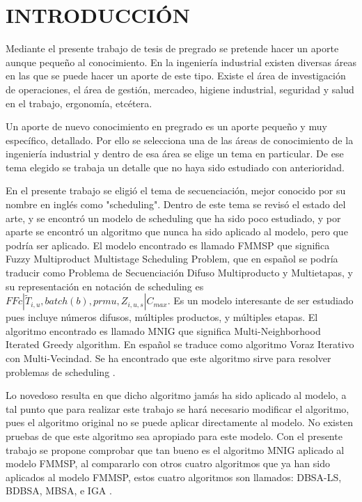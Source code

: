 \documentclass{article}
\def\notac_modelo{$FFc | \tilde{T}_{i, u}, batch(b), prmu, Z_{i, u, s} | C_{max}$}
\begin{document}
\section{INTRODUCCIÓN}

Mediante el presente trabajo de tesis de pregrado se pretende hacer un aporte aunque pequeño al conocimiento. En la ingeniería industrial existen diversas áreas en las que se puede hacer un aporte de este tipo. Existe el área de investigación de operaciones, el área de gestión, mercadeo, higiene industrial, seguridad y salud en el trabajo, ergonomía, etcétera. 

\vspace{\baselineskip}
Un aporte de nuevo conocimiento en pregrado es un aporte pequeño y muy específico, detallado. Por ello se selecciona una de las áreas de conocimiento de la ingeniería industrial y dentro de esa área se elige un tema en particular. De ese tema elegido se trabaja un detalle que no haya sido estudiado con anterioridad. 

\pagebreak

\vspace{\baselineskip}
En el presente trabajo se eligió el tema de secuenciación, mejor conocido por su nombre en inglés como "scheduling". Dentro de este tema se revisó el estado del arte, y se encontró un modelo de scheduling que ha sido poco estudiado, y por aparte se encontró un algoritmo que nunca ha sido aplicado al modelo, pero que podría ser aplicado. El modelo encontrado \autocite{modFMMSP} es llamado FMMSP que significa Fuzzy Multiproduct Multistage Scheduling Problem, que en español se podría traducir como Problema de Secuenciación Difuso Multiproducto y Multietapas, y su representación en notación de scheduling es \notac_modelo. Es un modelo interesante de ser estudiado pues incluye números difusos, múltiples productos, y múltiples etapas. El algoritmo encontrado \autocite{algMNIG} es llamado MNIG que significa Multi-Neighborhood Iterated Greedy algorithm. En español se traduce como algoritmo Voraz Iterativo con Multi-Vecindad. Se ha encontrado que este algoritmo sirve para resolver problemas de scheduling \autocite{algMNIG}. 

\vspace{\baselineskip}
Lo novedoso resulta en que dicho algoritmo jamás ha sido aplicado al modelo, a tal punto que para realizar este trabajo se hará necesario modificar el algoritmo, pues el algoritmo original no se puede aplicar directamente al modelo. No existen pruebas de que este algoritmo sea apropiado para este modelo. Con el presente trabajo se propone comprobar que tan bueno es el algoritmo MNIG aplicado al modelo FMMSP, al compararlo con otros cuatro algoritmos que ya han sido aplicados al modelo FMMSP, estos cuatro algoritmos son llamados: DBSA-LS, BDBSA, MBSA, e IGA \autocite{modFMMSP}.
\end{document}
